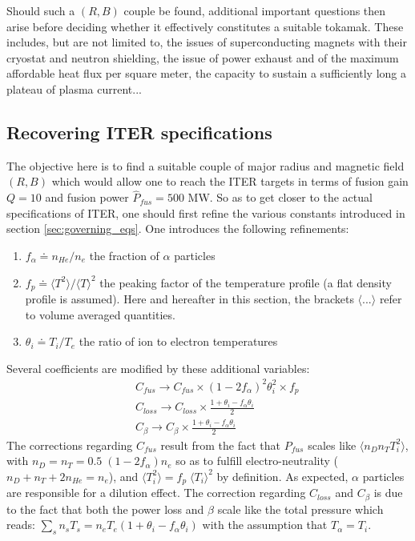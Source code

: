 Should such a $(R, B)$ couple be found, additional important questions then arise before deciding whether it effectively constitutes a suitable tokamak. These includes, but are not limited to, the issues of superconducting magnets with their cryostat and neutron shielding, the issue of power exhaust and of the maximum affordable heat flux per square meter, the capacity to sustain a sufficiently long a plateau of plasma current...

\subsection{Recovering ITER specifications}
\label{sec:ITER_spec}

The objective here is to find a suitable couple of major radius and magnetic field $(R,B)$ which would allow one to reach the ITER targets in terms of fusion gain $Q=10$ and fusion power $\hat P_{fus}=500$ MW.
So as to get closer to the actual specifications of ITER, one should first refine the various constants introduced in section \ref{sec:governing_eqs}. One introduces the following refinements:
\begin{enumerate}
	\item $f_\alpha \doteq n_{He}/n_e$ the fraction of $\alpha$ particles
	\item $f_p \doteq \langle T^2 \rangle / \langle T \rangle^2$ the peaking factor of the temperature profile (a flat density profile is assumed). Here and hereafter in this section, the brackets $\langle ...\rangle$ refer to volume averaged quantities.
	\item $\theta_i \doteq T_i/T_e$ the ratio of ion to electron temperatures
\end{enumerate}
Several coefficients are modified by these additional variables:
\begin{eqnarray*}
	&& C_{fus} \to C_{fus} \times (1-2f_\alpha)^2\theta_i^2 \times f_p \\
	&& C_{loss} \to C_{loss} \times \frac{1+\theta_i - f_\alpha\theta_i}{2}  \\
	&& C_\beta \to C_\beta \times \frac{1+\theta_i - f_\alpha\theta_i}{2}
\end{eqnarray*}
The corrections regarding $C_{fus}$ result from the fact that $P_{fus}$ scales like $\langle n_Dn_TT_i^2 \rangle$, with $n_D = n_T = 0.5\; (1-2f_\alpha)n_e$ so as to fulfill electro-neutrality ($n_D+n_T+2n_{He}=n_e$), and $\langle T_i^2 \rangle = f_p\; \langle T_i \rangle^2$ by definition. As expected, $\alpha$ particles are responsible for a dilution effect. The correction regarding $C_{loss}$ and $C_\beta$ is due to the fact that both the power loss and $\beta$ scale like the total pressure which reads: $\sum_s n_sT_s = n_eT_e (1+\theta_i- f_\alpha \theta_i)$ with the assumption that $T_\alpha=T_i$.
